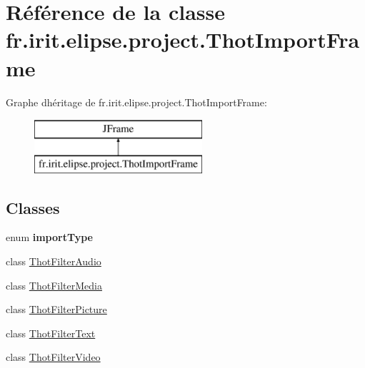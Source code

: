 \hypertarget{classfr_1_1irit_1_1elipse_1_1project_1_1_thot_import_frame}{}\section{Référence de la classe fr.\+irit.\+elipse.\+project.\+Thot\+Import\+Frame}
\label{classfr_1_1irit_1_1elipse_1_1project_1_1_thot_import_frame}
Graphe d\textquotesingle{}héritage de fr.\+irit.\+elipse.\+project.\+Thot\+Import\+Frame\+:\begin{figure}[H]
\begin{center}
\leavevmode
\includegraphics[height=2.000000cm]{classfr_1_1irit_1_1elipse_1_1project_1_1_thot_import_frame}
\end{center}
\end{figure}
\subsection*{Classes}
\begin{DoxyCompactItemize}
\item 
enum {\bfseries import\+Type}
\item 
class \mbox{\hyperlink{classfr_1_1irit_1_1elipse_1_1project_1_1_thot_import_frame_1_1_thot_filter_audio}{Thot\+Filter\+Audio}}
\item 
class \mbox{\hyperlink{classfr_1_1irit_1_1elipse_1_1project_1_1_thot_import_frame_1_1_thot_filter_media}{Thot\+Filter\+Media}}
\item 
class \mbox{\hyperlink{classfr_1_1irit_1_1elipse_1_1project_1_1_thot_import_frame_1_1_thot_filter_picture}{Thot\+Filter\+Picture}}
\item 
class \mbox{\hyperlink{classfr_1_1irit_1_1elipse_1_1project_1_1_thot_import_frame_1_1_thot_filter_text}{Thot\+Filter\+Text}}
\item 
class \mbox{\hyperlink{classfr_1_1irit_1_1elipse_1_1project_1_1_thot_import_frame_1_1_thot_filter_video}{Thot\+Filter\+Video}}
\end{DoxyCompactItemize}
